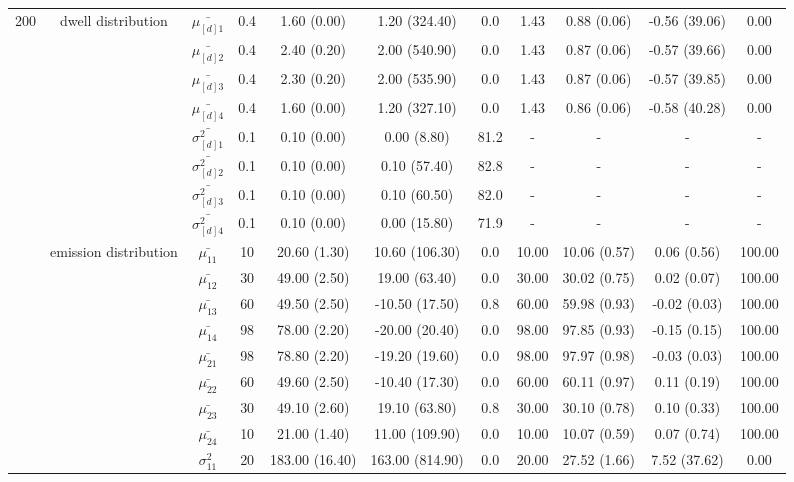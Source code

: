 \begin{table}[h]
{\begin{tabular}{ccccccccccc}
200 & dwell distribution & $\bar{\mu_{[d]1}}$ & 0.4 & 1.60 (0.00) & 1.20 (324.40) & 0.0 & 1.43 & 0.88 (0.06) & -0.56 (39.06) & 0.00 \\
\multirow{39}{*}{} & \multirow{7}{*}{} & $\bar{\mu_{[d]2}}$ & 0.4 & 2.40 (0.20) & 2.00 (540.90) & 0.0 & 1.43 & 0.87 (0.06) & -0.57 (39.66) & 0.00 \\
 &  & $\bar{\mu_{[d]3}}$ & 0.4 & 2.30 (0.20) & 2.00 (535.90) & 0.0 & 1.43 & 0.87 (0.06) & -0.57 (39.85) & 0.00 \\
 &  & $\bar{\mu_{[d]4}}$ & 0.4 & 1.60 (0.00) & 1.20 (327.10) & 0.0 & 1.43 & 0.86 (0.06) & -0.58 (40.28) & 0.00 \\
 &  & $\bar{\sigma^2_{[d]1}}$ & 0.1 & 0.10 (0.00) & 0.00 (8.80) & 81.2 & - & - & - & - \\
 &  & $\bar{\sigma^2_{[d]2}}$ & 0.1 & 0.10 (0.00) & 0.10 (57.40) & 82.8 & - & - & - & - \\
 &  & $\bar{\sigma^2_{[d]3}}$ & 0.1 & 0.10 (0.00) & 0.10 (60.50) & 82.0 & - & - & - & - \\
 &  & $\bar{\sigma^2_{[d]4}}$ & 0.1 & 0.10 (0.00) & 0.00 (15.80) & 71.9 & - & - & - & - \\
 & emission distribution & $\bar{\mu_{11}}$ & 10 & 20.60 (1.30) & 10.60 (106.30) & 0.0 & 10.00 & 10.06 (0.57) & 0.06 (0.56) & 100.00 \\
 & \multirow{15}{*}{} & $\bar{\mu_{12}}$ & 30 & 49.00 (2.50) & 19.00 (63.40) & 0.0 & 30.00 & 30.02 (0.75) & 0.02 (0.07) & 100.00 \\
 &  & $\bar{\mu_{13}}$ & 60 & 49.50 (2.50) & -10.50 (17.50) & 0.8 & 60.00 & 59.98 (0.93) & -0.02 (0.03) & 100.00 \\
 &  & $\bar{\mu_{14}}$ & 98 & 78.00 (2.20) & -20.00 (20.40) & 0.0 & 98.00 & 97.85 (0.93) & -0.15 (0.15) & 100.00 \\
 &  & $\bar{\mu_{21}}$ & 98 & 78.80 (2.20) & -19.20 (19.60) & 0.0 & 98.00 & 97.97 (0.98) & -0.03 (0.03) & 100.00 \\
 &  & $\bar{\mu_{22}}$ & 60 & 49.60 (2.50) & -10.40 (17.30) & 0.0 & 60.00 & 60.11 (0.97) & 0.11 (0.19) & 100.00 \\
 &  & $\bar{\mu_{23}}$ & 30 & 49.10 (2.60) & 19.10 (63.80) & 0.8 & 30.00 & 30.10 (0.78) & 0.10 (0.33) & 100.00 \\
 &  & $\bar{\mu_{24}}$ & 10 & 21.00 (1.40) & 11.00 (109.90) & 0.0 & 10.00 & 10.07 (0.59) & 0.07 (0.74) & 100.00 \\
 &  & $\sigma^2_{11}$ & 20 & 183.00 (16.40) & 163.00 (814.90) & 0.0 & 20.00 & 27.52 (1.66) & 7.52 (37.62) & 0.00 \\

\end{tabular}}
\end{table}
